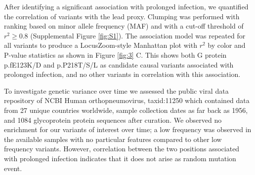 \documentclass{article} %
\begin{document}
After identifying a significant association with prolonged infection,
we quantified the correlation of variants with the lead proxy.
Clumping was performed with ranking based on minor allele frequency (MAF) and with a cut-off threshold of $r^2 \ge 0.8$ (Supplemental Figure \ref{fig:S1}).
The association model was repeated for all variants to produce a LocusZoom-style Manhattan plot with $r^2$ by color and P-value statistics as shown in 
Figure \ref{fig:3} C.
This shows both G protein 
p.fE123K/D and 
p.P218T/S/L as candidate causal variants associated with prolonged infection, and no other variants in correlation with this association. 


To investigate genetic variance over time
we assessed the public viral data repository of NCBI Human orthopneumovirus, taxid:11250 which contained data from 
27 unique countries worldwide, sample collection dates as far back as 1956, and 1084 glycoprotein protein sequences after curation.
We observed no enrichment for our variants of interest over time; 
a low frequency was observed in the available samples with no particular features compared to other low frequency variants. 
However, correlation between the two positions associated with prolonged infection indicates that it does not arise as random mutation event.
\end{document}
